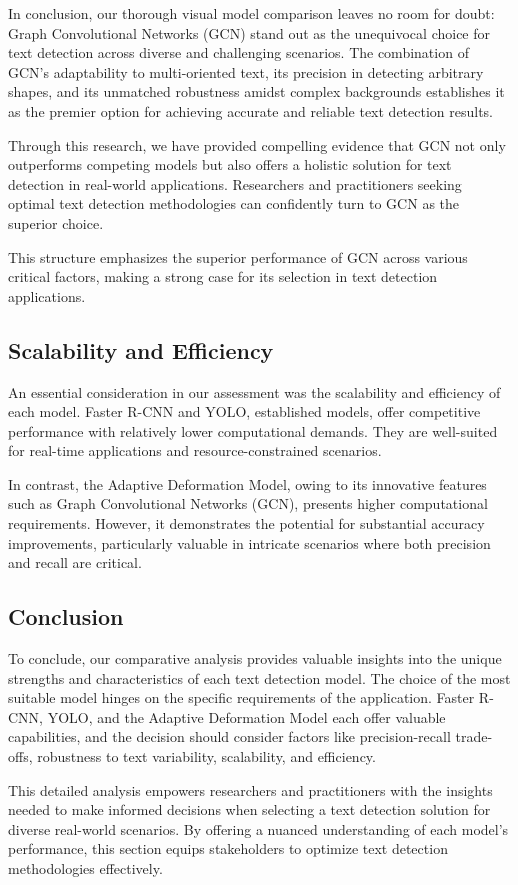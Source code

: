 In conclusion, our thorough visual model comparison leaves no room for doubt: Graph Convolutional Networks (GCN) stand out as the unequivocal choice for text detection across diverse and challenging scenarios. The combination of GCN's adaptability to multi-oriented text, its precision in detecting arbitrary shapes, and its unmatched robustness amidst complex backgrounds establishes it as the premier option for achieving accurate and reliable text detection results.

Through this research, we have provided compelling evidence that GCN not only outperforms competing models but also offers a holistic solution for text detection in real-world applications. Researchers and practitioners seeking optimal text detection methodologies can confidently turn to GCN as the superior choice.

This structure emphasizes the superior performance of GCN across various critical factors, making a strong case for its selection in text detection applications.

\subsection{Scalability and Efficiency}

An essential consideration in our assessment was the scalability and efficiency of each model. Faster R-CNN and YOLO, established models, offer competitive performance with relatively lower computational demands. They are well-suited for real-time applications and resource-constrained scenarios.

In contrast, the Adaptive Deformation Model, owing to its innovative features such as Graph Convolutional Networks (GCN), presents higher computational requirements. However, it demonstrates the potential for substantial accuracy improvements, particularly valuable in intricate scenarios where both precision and recall are critical.

\subsection{Conclusion}

To conclude, our comparative analysis provides valuable insights into the unique strengths and characteristics of each text detection model. The choice of the most suitable model hinges on the specific requirements of the application. Faster R-CNN, YOLO, and the Adaptive Deformation Model each offer valuable capabilities, and the decision should consider factors like precision-recall trade-offs, robustness to text variability, scalability, and efficiency.

This detailed analysis empowers researchers and practitioners with the insights needed to make informed decisions when selecting a text detection solution for diverse real-world scenarios. By offering a nuanced understanding of each model's performance, this section equips stakeholders to optimize text detection methodologies effectively.




\FloatBarrier


